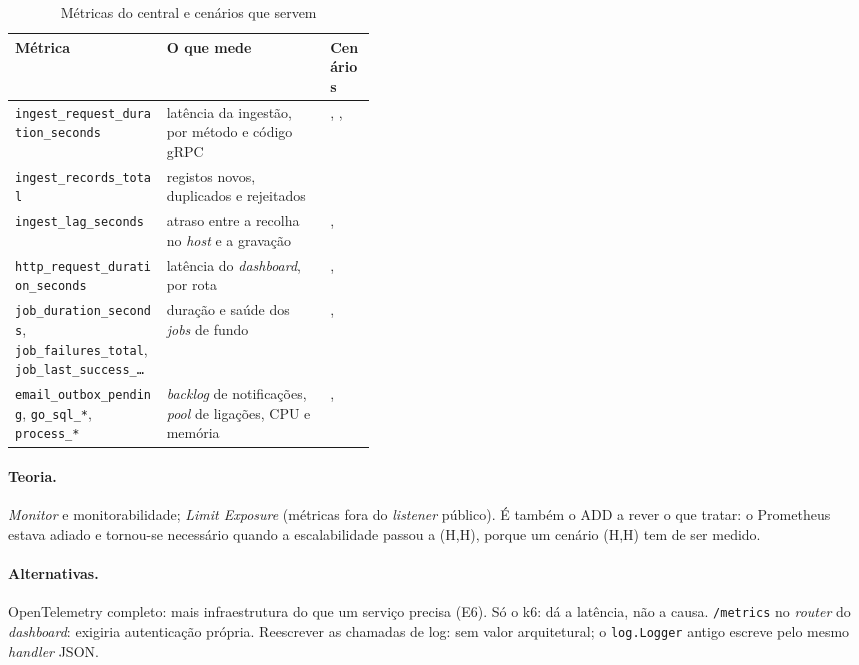 \begin{table}[htbp]
  \centering\small
  \caption{Métricas do central e cenários que servem}
  \label{tab:metricas-d4}
  \begin{tabularx}{\linewidth}{L{0.42\linewidth}Yl}
    \toprule
    Métrica & O que mede & Cenários \\
    \midrule
    \texttt{ingest\_request\_duration\_seconds} & latência da ingestão, por método e código gRPC & , ,  \\
    \texttt{ingest\_records\_total} & registos novos, duplicados e rejeitados &  \\
    \texttt{ingest\_lag\_seconds} & atraso entre a recolha no \emph{host} e a gravação & ,  \\
    \texttt{http\_request\_duration\_seconds} & latência do \emph{dashboard}, por rota & ,  \\
    \texttt{job\_duration\_seconds}, \texttt{job\_failures\_total}, \texttt{job\_last\_success\_\ldots} & duração e saúde dos \emph{jobs} de fundo & ,  \\
    \texttt{email\_outbox\_pending}, \texttt{go\_sql\_*}, \texttt{process\_*} & \emph{backlog} de notificações, \emph{pool} de ligações, CPU e memória & ,  \\
    \bottomrule
  \end{tabularx}
\end{table}

\paragraph{Teoria.}
\emph{Monitor} e monitorabilidade; \emph{Limit Exposure} (métricas fora do \emph{listener} público). É também o
ADD a rever o que tratar: o Prometheus estava adiado e tornou-se necessário quando a escalabilidade passou a (H,H),
porque um cenário (H,H) tem de ser medido.

\paragraph{Alternativas.}
OpenTelemetry completo: mais infraestrutura do que um serviço precisa (E6). Só o k6: dá a latência, não a causa.
\texttt{/metrics} no \emph{router} do \emph{dashboard}: exigiria autenticação própria. Reescrever as chamadas de
log: sem valor arquitetural; o \texttt{log.Logger} antigo escreve pelo mesmo \emph{handler} JSON.

